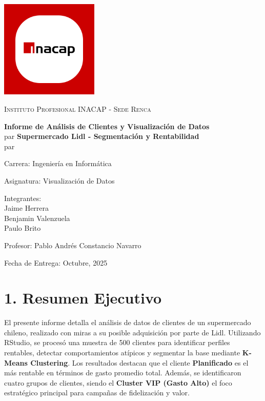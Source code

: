 \documentclass[12pt,a4paper]{article}
\begin{document}
\begin{titlepage}
    \centering
    \includegraphics[width=0.35\textwidth]{inacap_logo.png}\par\vspace{1cm}
    {\scshape\LARGE Instituto Profesional INACAP - Sede Renca \par}
    \vspace{1cm}
    {\Large \textbf{Informe de Análisis de Clientes y Visualización de Datos}}\\par
    \vspace{0.2cm}
    {\Large \textbf{Supermercado Lidl - Segmentación y Rentabilidad}}\\par
    \vspace{1cm}
    {\large Carrera: Ingeniería en Informática \par}
    \vspace{0.5cm}
    {\large Asignatura: Visualización de Datos \par}
    \vspace{1.5cm}
    {\large Integrantes:\\
    Jaime Herrera\\
    Benjamin Valenzuela\\
    Paulo Brito\\
    }\par
    \vspace{1.5cm}
    {\large Profesor: Pablo Andrés Constancio Navarro \par}
    \vspace{1.5cm}
    {\large Fecha de Entrega: Octubre, 2025 \par}
\end{titlepage}

\clearpage
{} %
\doublespacing %

\section*{1. Resumen Ejecutivo}
El presente informe detalla el análisis de datos de clientes de un supermercado chileno, realizado con miras a su posible adquisición por parte de Lidl. Utilizando RStudio, se procesó una muestra de 500 clientes para identificar perfiles rentables, detectar comportamientos atípicos y segmentar la base mediante \textbf{K-Means Clustering}. Los resultados destacan que el cliente \textbf{Planificado} es el más rentable en términos de gasto promedio total. Además, se identificaron cuatro grupos de clientes, siendo el \textbf{Cluster VIP (Gasto Alto)} el foco estratégico principal para campañas de fidelización y valor.
\end{document}
